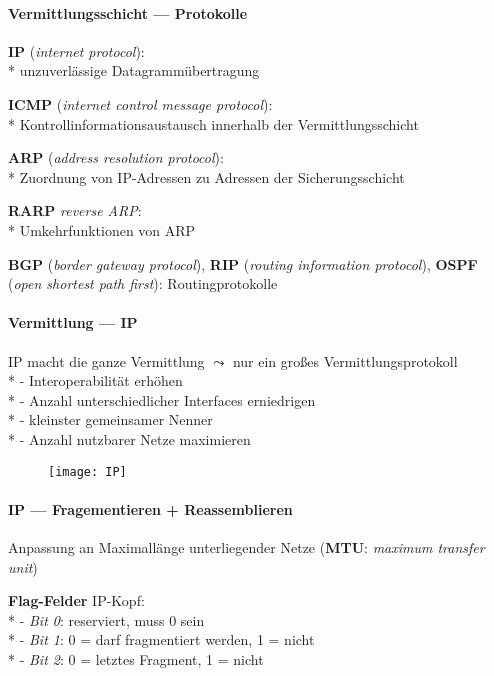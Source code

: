 \paragraph{Vermittlungsschicht --- Protokolle}
\begin{items}
  \item \textbf{IP} (\emph{internet protocol}): \\*
    unzuverlässige Datagrammübertragung
  \item \textbf{ICMP} (\emph{internet control message protocol}): \\*
    Kontrollinformationsaustausch innerhalb der Vermittlungsschicht
  \item \textbf{ARP} (\emph{address resolution protocol}): \\*
    Zuordnung von IP-Adressen zu Adressen der Sicherungsschicht
  \item \textbf{RARP} \emph{reverse ARP}: \\*
    Umkehrfunktionen von ARP
  \item \textbf{BGP} (\emph{border gateway protocol}), \textbf{RIP} (\emph{routing information protocol}), \textbf{OSPF} (\emph{open shortest path first}): Routingprotokolle
\end{items}

\paragraph{Vermittlung --- IP}
\begin{items}
  \item IP macht die ganze Vermittlung \( \leadsto \) nur ein großes Vermittlungsprotokoll \\*
    - Interoperabilität erhöhen \\*
    - Anzahl unterschiedlicher Interfaces erniedrigen \\*
    - kleinster gemeinsamer Nenner \\*
    - Anzahl nutzbarer Netze maximieren
\end{items}
\begin{figure}[H]\centering\label{IP}\texttt{[image: IP]}\end{figure}

\paragraph{IP --- Fragementieren + Reassemblieren}
\begin{items}
  \item Anpassung an Maximallänge unterliegender Netze (\textbf{MTU}: \emph{maximum transfer unit})
  \item \textbf{Flag-Felder} IP-Kopf: \\*
    - \emph{Bit 0}: reserviert, muss 0 sein \\*
    - \emph{Bit 1}: 0 = darf fragmentiert werden, 1 = nicht \\*
    - \emph{Bit 2}: 0 = letztes Fragment, 1 = nicht
\end{items}

